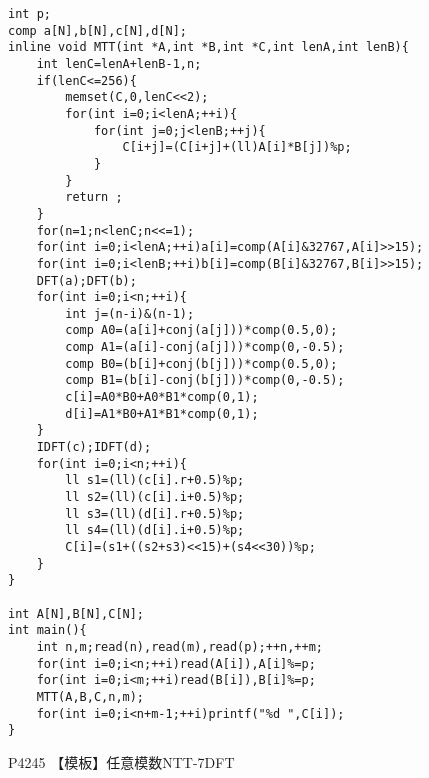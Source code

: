 \documentclass{ctexart}
\begin{document}
\begin{lstlisting}
int p;
comp a[N],b[N],c[N],d[N];
inline void MTT(int *A,int *B,int *C,int lenA,int lenB){
    int lenC=lenA+lenB-1,n;
    if(lenC<=256){
    	memset(C,0,lenC<<2);
    	for(int i=0;i<lenA;++i){
    		for(int j=0;j<lenB;++j){
    			C[i+j]=(C[i+j]+(ll)A[i]*B[j])%p;
    		}
    	}
    	return ;
    }
    for(n=1;n<lenC;n<<=1);
    for(int i=0;i<lenA;++i)a[i]=comp(A[i]&32767,A[i]>>15);
    for(int i=0;i<lenB;++i)b[i]=comp(B[i]&32767,B[i]>>15);
    DFT(a);DFT(b);
    for(int i=0;i<n;++i){
        int j=(n-i)&(n-1);
        comp A0=(a[i]+conj(a[j]))*comp(0.5,0);
        comp A1=(a[i]-conj(a[j]))*comp(0,-0.5);
        comp B0=(b[i]+conj(b[j]))*comp(0.5,0);
        comp B1=(b[i]-conj(b[j]))*comp(0,-0.5);
        c[i]=A0*B0+A0*B1*comp(0,1);
        d[i]=A1*B0+A1*B1*comp(0,1);
    }
    IDFT(c);IDFT(d);
    for(int i=0;i<n;++i){
        ll s1=(ll)(c[i].r+0.5)%p;
        ll s2=(ll)(c[i].i+0.5)%p;
        ll s3=(ll)(d[i].r+0.5)%p;
        ll s4=(ll)(d[i].i+0.5)%p;
        C[i]=(s1+((s2+s3)<<15)+(s4<<30))%p;
    }
}

int A[N],B[N],C[N];
int main(){
    int n,m;read(n),read(m),read(p);++n,++m;
    for(int i=0;i<n;++i)read(A[i]),A[i]%=p;
    for(int i=0;i<m;++i)read(B[i]),B[i]%=p;
    MTT(A,B,C,n,m);
    for(int i=0;i<n+m-1;++i)printf("%d ",C[i]);
}
\end{lstlisting}
P4245 【模板】任意模数NTT-7DFT
\end{document}
